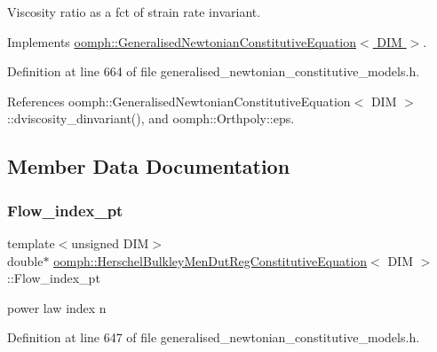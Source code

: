 Viscosity ratio as a fct of strain rate invariant. 



Implements \hyperlink{classoomph_1_1GeneralisedNewtonianConstitutiveEquation_a3e6d811786e39ca3c3a9b1c46249442f}{oomph\+::\+Generalised\+Newtonian\+Constitutive\+Equation$<$ D\+I\+M $>$}.



Definition at line 664 of file generalised\+\_\+newtonian\+\_\+constitutive\+\_\+models.\+h.



References oomph\+::\+Generalised\+Newtonian\+Constitutive\+Equation$<$ D\+I\+M $>$\+::dviscosity\+\_\+dinvariant(), and oomph\+::\+Orthpoly\+::eps.



\subsection{Member Data Documentation}
\mbox{\label{classoomph_1_1HerschelBulkleyMenDutRegConstitutiveEquation_adb825a9e34ad0ab06023bfcfe6425f7d}} 
\subsubsection{\texorpdfstring{Flow\+\_\+index\+\_\+pt}{Flow\_index\_pt}}
{\footnotesize\ttfamily template$<$unsigned D\+IM$>$ \\
double$\ast$ \hyperlink{classoomph_1_1HerschelBulkleyMenDutRegConstitutiveEquation}{oomph\+::\+Herschel\+Bulkley\+Men\+Dut\+Reg\+Constitutive\+Equation}$<$ D\+IM $>$\+::Flow\+\_\+index\+\_\+pt\hspace{0.3cm}{\ttfamily [private]}}



power law index n 



Definition at line 647 of file generalised\+\_\+newtonian\+\_\+constitutive\+\_\+models.\+h.

\mbox{\label{classoomph_1_1HerschelBulkleyMenDutRegConstitutiveEquation_aaf7844f5794416ec2e625bf6c326b34f}} 
